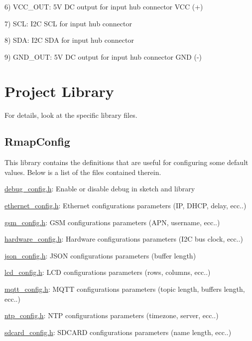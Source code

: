 6) V\+C\+C\+\_\+\+O\+UT\+: 5V DC output for input hub connector V\+CC (+)

7) S\+CL\+: I2C S\+CL for input hub connector

8) S\+DA\+: I2C S\+DA for input hub connector

9) G\+N\+D\+\_\+\+O\+UT\+: 5V DC output for input hub connector G\+ND (-\/)\hypertarget{index_library}{}\section{Project Library}\label{index_library}
For details, look at the specific library files.\hypertarget{index_rmapconfig}{}\subsection{Rmap\+Config}\label{index_rmapconfig}
This library contains the definitions that are useful for configuring some default values. Below is a list of the files contained therein.

\hyperlink{debug__config_8h}{debug\+\_\+config.\+h}\+: Enable or disable debug in sketch and library

\hyperlink{ethernet__config_8h}{ethernet\+\_\+config.\+h}\+: Ethernet configuration\textquotesingle{}s parameters (IP, D\+H\+CP, delay, ecc..)

\hyperlink{gsm__config_8h}{gsm\+\_\+config.\+h}\+: G\+SM configuration\textquotesingle{}s parameters (A\+PN, username, ecc..)

\hyperlink{hardware__config_8h}{hardware\+\_\+config.\+h}\+: Hardware configuration\textquotesingle{}s parameters (I2C bus clock, ecc..)

\hyperlink{json__config_8h}{json\+\_\+config.\+h}\+: J\+S\+ON configuration\textquotesingle{}s parameters (buffer length)

\hyperlink{lcd__config_8h}{lcd\+\_\+config.\+h}\+: L\+CD configuration\textquotesingle{}s parameters (rows, columns, ecc..)

\hyperlink{mqtt__config_8h}{mqtt\+\_\+config.\+h}\+: M\+Q\+TT configuration\textquotesingle{}s parameters (topic length, buffers length, ecc..)

\hyperlink{ntp__config_8h}{ntp\+\_\+config.\+h}\+: N\+TP configuration\textquotesingle{}s parameters (timezone, server, ecc..)

\hyperlink{sdcard__config_8h}{sdcard\+\_\+config.\+h}\+: S\+D\+C\+A\+RD configuration\textquotesingle{}s parameters (name length, ecc..)

